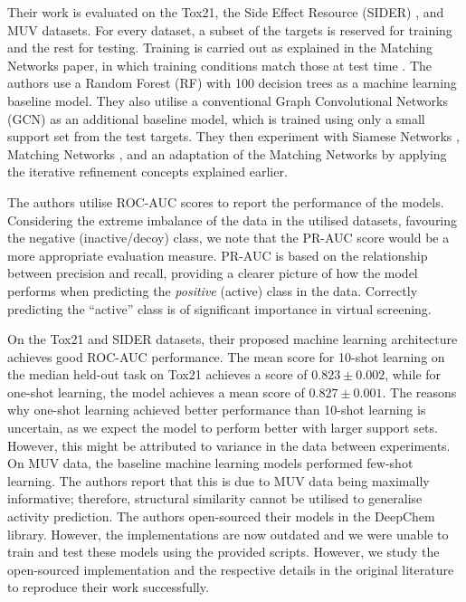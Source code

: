 \documentclass[journal=jcisd8,manuscript=article]{achemso} %
\begin{document}
Their work is evaluated on the Tox21, the Side Effect Resource (SIDER) \citep{kuhn2016sider}, and MUV datasets\citep{rohrer2009maximum}. For every dataset, a subset of the targets is reserved for training and the rest for testing. Training is carried out as explained in the Matching Networks paper, in which training conditions match those at test time \citep{vinyals2016matching}. The authors use a Random Forest (RF) with 100 decision trees as a machine learning baseline model. They also utilise a conventional Graph Convolutional Networks (GCN) \citep{kipf2016semi} as an additional baseline model, which is trained using only a small support set from the test targets. They then experiment with Siamese Networks \citep{koch2015siamese}, Matching Networks \citep{vinyals2016matching}, and an adaptation of the Matching Networks by applying the iterative refinement concepts explained earlier.

The authors utilise ROC-AUC scores to report the performance of the models. Considering the extreme imbalance of the data in the utilised datasets, favouring the negative (inactive/decoy) class, we note that the PR-AUC score would be a more appropriate evaluation measure. PR-AUC is based on the relationship between precision and recall, providing a clearer picture of how the model performs when predicting the \textit{positive} (active) class in the data. Correctly predicting the ``active'' class is of significant importance in virtual screening.

On the Tox21 and SIDER datasets, their proposed machine learning architecture achieves good ROC-AUC performance. The mean score for 10-shot learning on the median held-out task on Tox21 achieves a score of $0.823 \pm 0.002$, while for one-shot learning, the model achieves a mean score of $0.827 \pm 0.001$. The reasons why one-shot learning achieved better performance than 10-shot learning is uncertain, as we expect the model to perform better with larger support sets. However, this might be attributed to variance in the data between experiments. On MUV data, the baseline machine learning models performed few-shot learning. The authors report that this is due to MUV data being maximally informative; therefore, structural similarity cannot be utilised to generalise activity prediction. The authors open-sourced their models in the DeepChem library\citep{ramsundar2019deep}. However, the implementations are now outdated and we were unable to train and test these models using the provided scripts. However, we study the open-sourced implementation and the respective details in the original literature to reproduce their work successfully.
\end{document}
